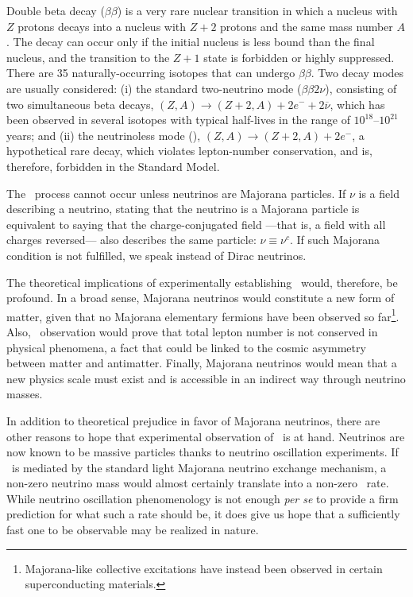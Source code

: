Double beta decay ($\beta\beta$) is a very rare nuclear transition in which a nucleus with $Z$ protons decays into a nucleus with $Z + 2$ protons and the same mass number $A$. The decay can occur only if the initial nucleus is less bound than the final nucleus, and the transition to the $Z+1$ state is forbidden or highly suppressed. There are 35 naturally-occurring isotopes that can undergo $\beta\beta$. Two decay modes are usually considered: (i) the standard two-neutrino mode ($\beta\beta2\nu$), consisting of two simultaneous beta decays, $(Z,A) \rightarrow (Z + 2,A) + 2 e^- +2\overline{\nu}$, which has been observed in several isotopes with typical half-lives in the range of $10^{18}$--$10^{21}$ years; and (ii) the neutrinoless mode (\bbonu), $(Z,A) \rightarrow (Z +2, A) + 2 e^-$, a hypothetical rare decay, which violates lepton-number conservation, and is, therefore, forbidden in the Standard Model.

The \bbonu\ process cannot occur unless neutrinos are Majorana particles. If $\nu$ is a field describing a neutrino, stating that the neutrino is a Majorana particle is equivalent to saying that the charge-conjugated field ---\thinspace that is, a field with all charges reversed\thinspace--- also describes the same particle: $\nu\equiv\nu^c$. If such Majorana condition is not fulfilled, we speak instead of Dirac neutrinos. 

The theoretical implications of experimentally establishing \bbonu\ would, therefore, be profound. In a broad sense, Majorana neutrinos would constitute a new form of matter, given that no Majorana elementary fermions have been observed so far\footnote{Majorana-like collective excitations have instead been observed in certain superconducting materials.}. Also, \bbonu\ observation would prove that total lepton number is not conserved in physical phenomena, a fact that could be linked to the cosmic asymmetry between matter and antimatter. Finally, Majorana neutrinos would mean that a new physics scale must exist and is accessible in an indirect way through neutrino masses. 

In addition to theoretical prejudice in favor of Majorana neutrinos, there are other reasons to hope that experimental observation of \bbonu\ is at hand. Neutrinos are now known to be massive particles thanks to neutrino oscillation experiments. If \bbonu\ is mediated by the standard light Majorana neutrino exchange mechanism, a non-zero neutrino mass would almost certainly translate into a non-zero \bbonu\ rate. While neutrino oscillation phenomenology is not enough \emph{per se} to provide a firm prediction for what such a rate should be, it does give us hope that a sufficiently fast one to be observable may be realized in nature. 

